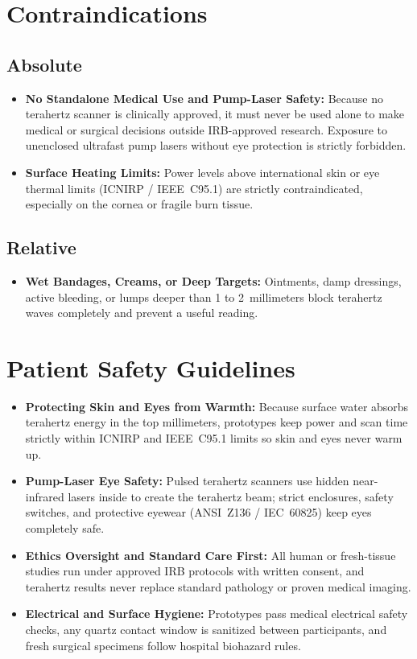 \section{Contraindications}

\subsection{Absolute}
\begin{itemize}
  \item \textbf{No Standalone Medical Use and Pump-Laser Safety:} Because no terahertz scanner is clinically approved, it must never be used alone to make medical or surgical decisions outside IRB-approved research. Exposure to unenclosed ultrafast pump lasers without eye protection is strictly forbidden.
  \item \textbf{Surface Heating Limits:} Power levels above international skin or eye thermal limits (ICNIRP / IEEE~C95.1) are strictly contraindicated, especially on the cornea or fragile burn tissue.
\end{itemize}

\subsection{Relative}
\begin{itemize}
  \item \textbf{Wet Bandages, Creams, or Deep Targets:} Ointments, damp dressings, active bleeding, or lumps deeper than 1 to 2~millimeters block terahertz waves completely and prevent a useful reading.
\end{itemize}

\section{Patient Safety Guidelines}
\begin{itemize}
  \item \textbf{Protecting Skin and Eyes from Warmth:} Because surface water absorbs terahertz energy in the top millimeters, prototypes keep power and scan time strictly within ICNIRP and IEEE~C95.1 limits so skin and eyes never warm up.
  \item \textbf{Pump-Laser Eye Safety:} Pulsed terahertz scanners use hidden near-infrared lasers inside to create the terahertz beam; strict enclosures, safety switches, and protective eyewear (ANSI~Z136 / IEC~60825) keep eyes completely safe.
  \item \textbf{Ethics Oversight and Standard Care First:} All human or fresh-tissue studies run under approved IRB protocols with written consent, and terahertz results never replace standard pathology or proven medical imaging.
  \item \textbf{Electrical and Surface Hygiene:} Prototypes pass medical electrical safety checks, any quartz contact window is sanitized between participants, and fresh surgical specimens follow hospital biohazard rules.
\end{itemize}

